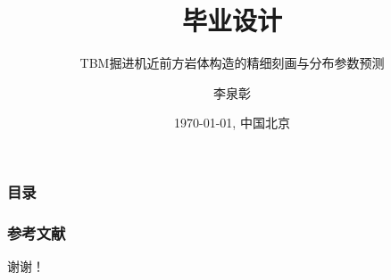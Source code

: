 \documentclass[10pt]{beamer}
\subtitle[TBM掘进机近前方岩体构造的精细刻画与分布参数预测]{TBM掘进机近前方岩体构造的精细刻画与分布参数预测}
\title[毕业设计]{毕业设计}
\author[李泉彰]{李泉彰}
\institute[中国科学院大学~~数学科学学院]{中国科学院大学~~数学科学学院}
\date[\today]{\today, 中国北京}
\begin{document}
\begin{frame}[plain]
  \maketitle
\end{frame}

\begin{frame}[t]
  \frametitle{目录}
  \tableofcontents
\end{frame}









\makeatother

\begin{frame}
  \frametitle{参考文献}
  \nocite{*}%
  \printbibliography%
\end{frame}

\begin{frame}[plain]
  \vfill
  \centerline{\Huge 谢谢！}
  \vfill
\end{frame}
\end{document}
